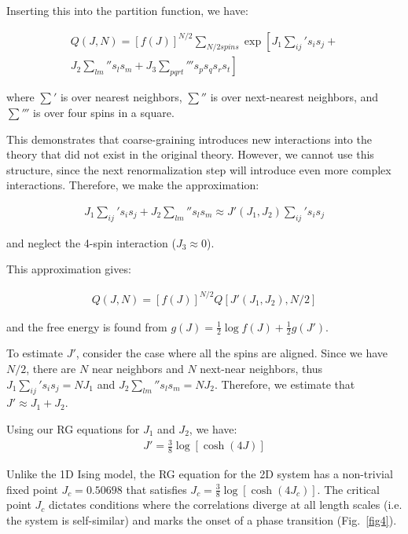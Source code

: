 \documentclass[book.tex]{subfiles}
\begin{document}
Inserting this into the partition function, we have:

\begin{align}\label{Eq7}
Q(J,N) = [f(J)]^{N/2} \sum_{N/2 spins}\exp\left[ J_1\sum_{ij}{'}s_i s_j + \right. \\
 \left. J_2\sum_{lm}{''}s_l s_m + J_3\sum_{pqrt}{'''}s_p s_q s_r s_t \right] 
\end{align}

\noindent where $\sum{'}$ is over nearest neighbors, $\sum{''}$ is over next-nearest neighbors, and $\sum{'''}$ is over four spins in a square.

This demonstrates that coarse-graining introduces new interactions into the theory that did not exist in the original theory. However, we cannot use this structure, since the next renormalization step will introduce even more complex interactions. Therefore, we make the approximation:

\begin{align}\label{Eq8}
J_1\sum_{ij}{'}s_is_j+J_2\sum_{lm}{''}s_ls_m \approx J'(J_1,J_2)\sum_{ij}{'}s_is_j
\end{align}

\noindent and neglect the 4-spin interaction ($J_3 \approx 0$).

This approximation gives:

\begin{align}\label{Eq9}
Q(J,N) = [f(J)]^{N/2} Q[J'(J_1,J_2),N/2]
\end{align}

\noindent and the free energy is found from $g(J)=\frac{1}{2}\log f(J)+\frac{1}{2}g(J')$.

To estimate $J'$, consider the case where all the spins are aligned. Since we have $N/2$, there are $N$ near neighbors and $N$ next-near neighbors, thus $J_1\sum_{i j}{'}s_is_j = NJ_1$ and $J_2\sum_{lm}{''}s_ls_m = NJ_2$. Therefore, we estimate that $J'\approx J_1+J_2$.

Using our RG equations for $J_1$ and $J_2$, we have:
\begin{align}
J'=\frac{3}{8}\log[\cosh(4J)] 
\end{align}

Unlike the 1D Ising model, the RG equation for the 2D system has a non-trivial fixed point $J_c = 0.50698$ that satisfies $J_c = \frac{3}{8}\log[\cosh(4J_c)]$. The critical point $J_c$ dictates conditions where the correlations diverge at all length scales (i.e. the system is self-similar) and marks the onset of a phase transition (Fig.~\ref{fig4}).
\end{document}
